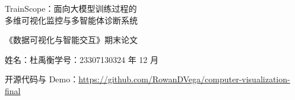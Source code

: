 \documentclass[UTF8,a4paper,zihao=-4,fontset=windows]{ctexart}
\begin{document}
\begin{center}
  {\heiti{} TrainScope：面向大模型训练过程的\\[4pt] 多维可视化监控与多智能体诊断系统\par}
  \vspace{10pt}
  { 《数据可视化与智能交互》期末论文\par}
  \vspace{6pt}
  { 姓名：杜禹衡\qquad 学号：23307130324 年 12 月\par}
  \vspace{2pt}
  { 开源代码与 Demo：\url{https://github.com/RowanDVega/computer-visualization-final}\par}
\end{center}
\vspace{4pt}




\end{document}
